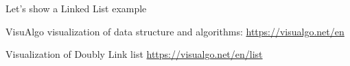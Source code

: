 \documentclass[aspectratio=169]{beamer}
\begin{document}
\begin{frame}{Let's show a Linked List example}
    \begin{block}{VisuAlgo}
         visualization of data structure and algorithms: \url{https://visualgo.net/en}
    \end{block}
    \begin{block}{Visualization of Doubly Link list}
        \url{https://visualgo.net/en/list}
    \end{block}
\end{frame}






\end{document}
